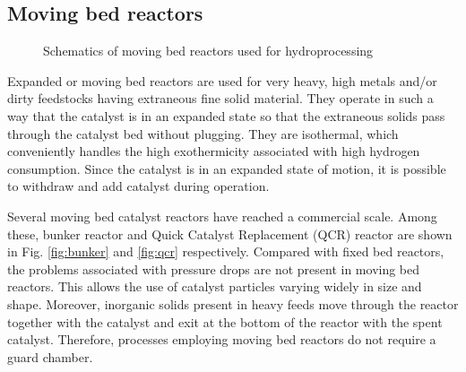 \subsection{Moving bed reactors}

\begin{figure}[htbp]
\centering
{}
\quad
{}
\caption{Schematics of moving bed reactors used for hydroprocessing \citep{tagkey2007217}}
\label{fig:reactors}
\end{figure}

Expanded or moving bed reactors are used for very heavy, high metals and/or dirty feedstocks having extraneous fine solid material. They operate in such a way that the catalyst is in an expanded state so that the extraneous solids pass through the catalyst bed without plugging. They are isothermal, which conveniently handles the high exothermicity associated with high hydrogen consumption. Since the catalyst is in an expanded state of motion, it is possible to  withdraw and add catalyst during operation.

Several moving bed catalyst reactors have reached a commercial scale. Among these, bunker reactor and Quick Catalyst Replacement (QCR) reactor are shown in Fig. \ref{fig:bunker} and \ref{fig:qcr} respectively. Compared with fixed bed reactors, the problems associated with pressure drops are not present in moving bed reactors. This allows the use of catalyst particles varying widely in size and shape. Moreover, inorganic solids present in heavy feeds move through the reactor together with the catalyst and exit at the bottom of the reactor with the spent catalyst. Therefore, processes employing moving bed reactors do not require a guard chamber.

